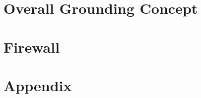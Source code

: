 \documentclass{article}[12pt]
\begin{document}
\newpage
\section{Overall Grounding Concept}\label{sec:GroundingConcept}


\newpage
\section{Firewall}\label{sec:Firewall}


\appendix
\renewcommand{\figurename}{Appendix}

\section{Appendix}\label{sec:Appendix}


\end{document}
